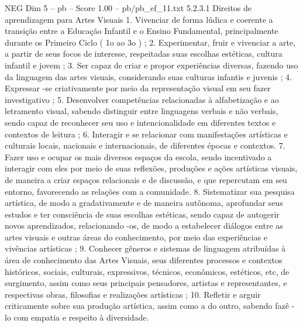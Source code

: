 \begin{textsample}{NEG Dim 5 – pb – Score 1.00 – pb/pb\_ef\_11.txt}  \label{ex:f5_neg_197}
5.2.3.1 Direitos de aprendizagem para Artes Visuais 1.
Vivenciar de forma lúdica e coerente a transição entre a Educação Infantil e o Ensino Fundamental, principalmente durante os Primeiro Ciclo ( 1o ao 3o ) ; 2.
Experimentar, fruir e vivenciar a arte, a partir de seus focos de interesse, respeitadas suas escolhas estéticas, cultura infantil e jovem ; 3.
Ser capaz de criar e propor experiências diversas, fazendo uso da linguagem das artes visuais, considerando suas culturas infantis e juvenis ; 4.
Expressar -se criativamente por meio da representação visual em seu fazer investigativo ; 5.
Desenvolver competências relacionadas à alfabetização e ao letramento visual, sabendo distinguir entre linguagens verbais e não verbais, sendo capaz de reconhecer seu uso e intencionalidade em diferentes textos e contextos de leitura ; 6.
Interagir e se relacionar com manifestações artísticas e culturais locais, nacionais e internacionais, de diferentes épocas e contextos. 7.
Fazer uso e ocupar os mais diversos espaços da escola, sendo incentivado a interagir com eles por meio de suas reflexões, produções e ações artísticas visuais, de maneira a criar espaços relacionais e de discussão, e que repercutam em seu entorno, favorecendo as relações com a comunidade. 8.
Sistematizar sua pesquisa artística, de modo a gradativamente e de maneira autônoma, aprofundar seus estudos e ter consciência de suas escolhas estéticas, sendo capaz de autogerir novos aprendizados, relacionando -os, de modo a estabelecer diálogos entre as artes visuais e outras áreas do conhecimento, por meio das experiências e vivências artísticas ; 9.
Conhecer gêneros e sistemas de linguagem atribuídas à área de conhecimento das Artes Visuais, seus diferentes processos e contextos históricos, sociais, culturais, expressivos, técnicos, econômicos, estéticos, etc, de surgimento, assim como seus principais pensadores, artistas e representantes, e respectivas obras, filosofias e realizações artísticas ; 10.
Refletir e arguir criticamente sobre sua produção artística, assim como a do outro, sabendo fazê -lo com empatia e respeito à diversidade.

\end{textsample}
